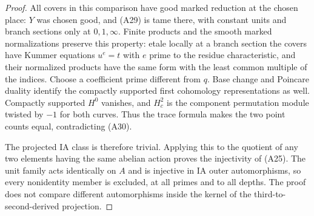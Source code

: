 \begin{proof}
All covers in this comparison have good marked reduction
at the chosen place: $Y$ was chosen good, and (A29) is
tame there, with constant units and branch sections only
at $0,1,\infty$. Finite products and the smooth marked
normalizations preserve this property: etale locally at
a branch section the covers have Kummer equations
$u^e=t$ with $e$ prime to the residue characteristic,
and their normalized products have the same form with
the least common multiple of the indices. Choose a
coefficient prime different from $q$. Base change and
Poincare duality identify the compactly supported first
cohomology representations as well. Compactly supported
$H^0$ vanishes, and $H^2_c$ is the component permutation
module twisted by $-1$ for both curves. Thus the trace
formula makes the two point counts equal, contradicting
(A30).

The projected IA class is therefore trivial. Applying
this to the quotient of any two elements having the
same abelian action proves the injectivity of (A25).
The unit family acts identically on $A$ and is injective
in IA outer automorphisms, so every nonidentity member
is excluded, at all primes and to all depths. The proof
does not compare different automorphisms inside the
kernel of the third-to-second-derived projection.
\end{proof}

